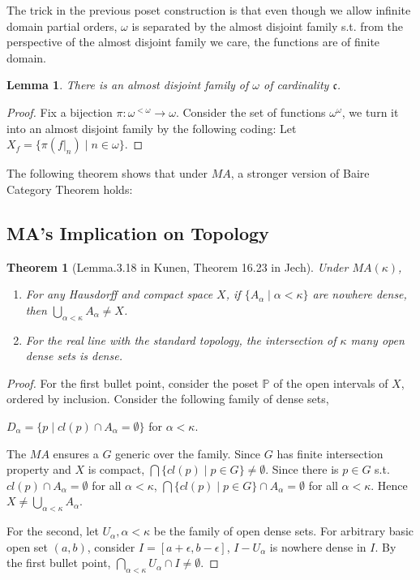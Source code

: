 \documentclass{article}
\newtheorem{lemma}{Lemma}
\newtheorem{theorem}{Theorem}
\newcommand{\bbP}{\mathbb{P}}
\begin{document}
The trick in the previous poset construction is that even though we allow infinite domain partial orders, $\omega$ is separated by the almost disjoint family s.t. from the perspective of the almost disjoint family we care, the functions are of finite domain.

\begin{lemma}
    There is an almost disjoint family of $\omega$ of cardinality $\mathfrak{c}$. 
\end{lemma}

\begin{proof}
    Fix a bijection $\pi:\omega^{ <\omega} \to \omega$. Consider the set of functions $\omega^\omega$, we turn it into an almost disjoint family by the following coding: Let $X_f = \{\pi(f|_n)\mid n\in \omega\}$.
\end{proof}

The following theorem shows that under $MA$, a stronger version of Baire Category Theorem holds:

\subsection{MA's Implication on Topology}

\begin{theorem}[Lemma.3.18 in Kunen, Theorem 16.23 in Jech]
 Under $MA(\kappa)$,
\begin{enumerate}
    \item For any Hausdorff and compact space $X$, if $\{A_\alpha\mid \alpha<\mathfrak{\kappa}\}$ are nowhere dense, then $\bigcup_{\alpha<\kappa}A_\alpha\neq X$.
    \item For the real line with the standard topology, the intersection of $\kappa$ many open dense sets is dense.
\end{enumerate}
\end{theorem}

\begin{proof}
    For the first bullet point, consider the poset $\bbP$ of the open intervals of $X$, ordered by inclusion. Consider the following family of dense sets,

    $D_\alpha = \{p\mid cl(p)\cap A_\alpha = \emptyset\}$ for $\alpha<\kappa$.

    The $MA$ ensures a $G$ generic over the family. Since $G$ has finite intersection property and $X$ is compact, $\bigcap\{cl(p)\mid p\in G\}\neq \emptyset$. Since there is $p\in G$ s.t. $cl(p)\cap A_\alpha = \emptyset$ for all $\alpha<\kappa$, $\bigcap\{cl(p)\mid p\in G\}\cap A_\alpha = \emptyset$ for all $\alpha<\kappa $. Hence $X\neq \bigcup_{\alpha<\kappa}A_\alpha$.

    For the second, let $U_\alpha,\alpha<\kappa$ be the family of open dense sets. For arbitrary basic open set $(a,b)$, consider $I = [a+\epsilon,b-\epsilon]$, $I - U_\alpha$ is nowhere dense in $I$. By the first bullet point, $\bigcap_{\alpha<\kappa}U_\alpha \cap I\neq \emptyset$.
\end{proof}
\end{document}
